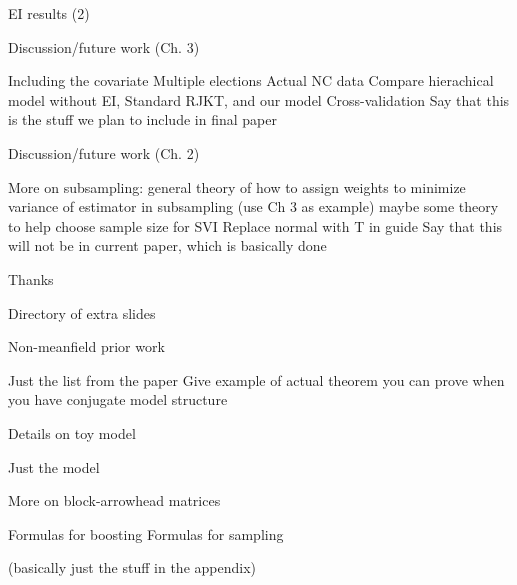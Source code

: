 \documentclass[ignorenonframetext,]{beamer}
\begin{document}
\begin{frame}{EI results (2)}

\end{frame}

\begin{frame}{Discussion/future work (Ch. 3)}

Including the covariate Multiple elections Actual NC data Compare
hierachical model without EI, Standard RJKT, and our model
Cross-validation Say that this is the stuff we plan to include in final
paper

\end{frame}

\begin{frame}{Discussion/future work (Ch. 2)}

More on subsampling: general theory of how to assign weights to minimize
variance of estimator in subsampling (use Ch 3 as example) maybe some
theory to help choose sample size for SVI Replace normal with T in guide
Say that this will not be in current paper, which is basically done

\end{frame}

\begin{frame}{Thanks}

\end{frame}

\begin{frame}{Directory of extra slides}

\end{frame}

\begin{frame}{Non-meanfield prior work}

Just the list from the paper Give example of actual theorem you can
prove when you have conjugate model structure

\end{frame}

\begin{frame}{Details on toy model}

Just the model

\end{frame}

\begin{frame}{More on block-arrowhead matrices}

Formulas for boosting Formulas for sampling

(basically just the stuff in the appendix)

\end{frame}
\end{document}
